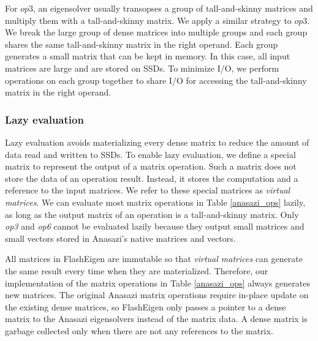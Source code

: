 For $op3$, an eigensolver usually transopses a group of tall-and-skinny matrices
and multiply them with a tall-and-skinny matrix. We apply a similar strategy to
$op3$. We break the large group of dense matrices into multiple groups and each
group shares the same tall-and-skinny matrix in the right operand. Each group
generates
a small matrix that can be kept in memory. In this case, all input matrices
are large and are stored on SSDs. To minimize I/O, we perform operations on
each group together to share I/O for accessing the tall-and-skinny matrix
in the right operand.


\subsubsection{Lazy evaluation} \label{sec:lazy_eval}
Lazy evaluation avoids materializing every dense matrix to reduce the amount
of data read and written to SSDs.
To enable lazy evaluation, we define a special matrix to represent the output
of a matrix operation. Such a matrix does not store the data of
an operation result. Instead, it stores the computation and a reference to
the input matrices. We refer to these special matrices as \textit{virtual matrices}.
We can evaluate most matrix operations in Table \ref{anasazi_ops} lazily,
as long as the output matrix of an operation is a tall-and-skinny matrix. Only \textit{op3}
and \textit{op6} cannot be evaluated lazily because they output small matrices
and small vectors stored in Anasazi's native matrices and vectors.


All matrices in FlashEigen are immutable so that \textit{virtual matrices}
can generate the same result every time when they are materialized. Therefore,
our implementation of the matrix operations in Table \ref{anasazi_ops} always
generates new matrices. The original Anasazi matrix operations require in-place
update on the existing dense matrices, so FlashEigen only passes a pointer to
a dense matrix to the Anasazi eigensolvers instead of the matrix data.
A dense matrix is garbage collected only when there are not any references to
the matrix.

